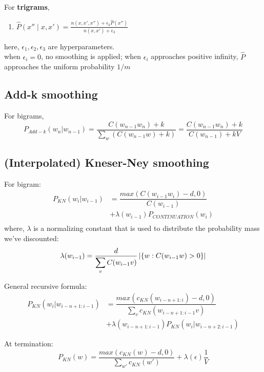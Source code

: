 \vspace{0.5cm}
\noindent
For \textbf{trigrams},
\begin{enumerate}
    \item $\hat{P}(x'' \mid x,x') = \frac{n(x, x',x'') + \epsilon_3 \hat{P}(x'')}{n(x, x') + \epsilon_3}$ \hfill \cite{dnn-1}

\end{enumerate}

\vspace{0.5cm}
\noindent
here, $\epsilon_1,\epsilon_2, \epsilon_3$ are hyperparameters.\\
when $\epsilon_i = 0$, no smoothing is applied; when $\epsilon_i$ approaches positive infinity, $\hat{P}$ approaches the uniform probability $1/m$





\subsection{Add-k smoothing \cite{nlp-1}}

For bigrams,
\[
    P_{Add-k}(w_n|w_{n-1}) = \dfrac{C(w_{n-1}w_n) + k}{\sum_w (C(w_{n-1}w) + k)} = \dfrac{C(w_{n-1}w_n) + k}{C(w_{n-1}) + kV} 
\]

\subsection{(Interpolated) Kneser-Ney smoothing}

For bigram:
\begin{align*}
    P_{KN}(w_i|w_{i-1})  &= \dfrac{max(C(w_{i-1}w_i)-d,0)}{C(w_{i-1})} \\ 
    &+ \lambda (w_{i-1})P_{CONTINUATION}(w_i) \\ 
\end{align*}
where, $\lambda$ is a normalizing constant that is used to distribute the probability mass we’ve discounted:
\[
    \lambda(w_{i-1}) 
    = \dfrac{d}{\displaystyle\sum_v C(w_{i-1}v)} \left| \left\{w : C(w_{i-1}w) > 0\right\} \right|
\]

General recursive formula:
\begin{align*}
    P_{KN}(w_i|w_{i-n+1:i-1})  &= \dfrac{max(c_{KN}(w_{i-n+1:i})-d,0)}{\sum_v c_{KN}(w_{i-n+1:i-1} v)} \\ 
    &+ \lambda (w_{i-n+1:i-1})P_{KN}(w_i|w_{i-n+2:i-1}) 
\end{align*}

At termination:
\[
    P_{KN}(w) = \dfrac{max(c_{KN}(w)-d,0)}{\sum_{w'} c_{KN}(w')} + \lambda(\epsilon)\dfrac{1}{V}
\]

